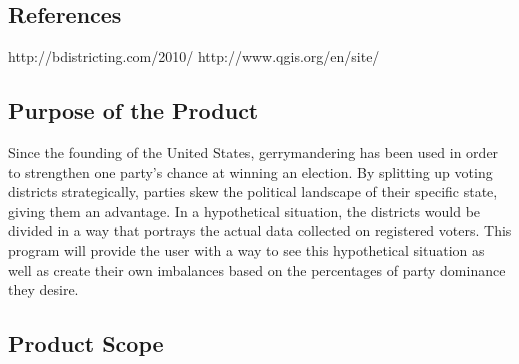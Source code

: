 \documentclass{article}
\begin{document}
\vspace{2.5mm}


\subsection{References}

\vspace{2.5mm}

\begin{addmargin}[4em]{0em}

http://bdistricting.com/2010/
http://www.qgis.org/en/site/

\end{addmargin}

\vspace{2.5mm}


\subsection{Purpose of the Product}

\vspace{2.5mm}

\begin{addmargin}[4em]{0em}

Since the founding of the United States, gerrymandering has been used in order to strengthen one party's chance at winning an election. By splitting up voting districts strategically, parties skew the political landscape of their specific state, giving them an advantage. In a hypothetical situation, the districts would be divided in a way that portrays the actual data collected on registered voters. This program will provide the user with a way to see this hypothetical situation as well as create their own imbalances based on the percentages of party dominance they desire.

\vspace{2.5mm}

\end{addmargin}


\subsection{Product Scope}

\vspace{2.5mm}
\end{document}
